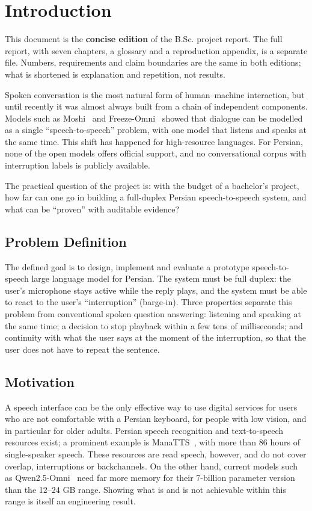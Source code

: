 \chapter{Introduction}
\label{ch:intro}

This document is the \textbf{concise edition} of the B.Sc. project report. The
full report, with seven chapters, a glossary and a reproduction appendix, is a
separate file. Numbers, requirements and claim boundaries are the same in both
editions; what is shortened is explanation and repetition, not results.

Spoken conversation is the most natural form of human--machine interaction, but
until recently it was almost always built from a chain of independent
components. Models such as Moshi~\cite{defossez2024moshi} and
Freeze-Omni~\cite{wang2025freezeomni} showed that dialogue can be modelled as a
single ``speech-to-speech'' problem, with one model that listens and speaks at
the same time. This shift has happened for high-resource languages. For Persian,
none of the open models offers official support, and no conversational corpus
with interruption labels is publicly available.

The practical question of the project is: with the budget of a bachelor's
project, how far can one go in building a full-duplex Persian speech-to-speech
system, and what can be ``proven'' with auditable evidence?

\section{Problem Definition}
\label{sec:problem}

The defined goal is to design, implement and evaluate a prototype
speech-to-speech large language model for Persian. The system must be full
duplex: the user's microphone stays active while the reply plays, and the system
must be able to react to the user's ``interruption'' (barge-in). Three properties
separate this problem from conventional spoken question answering: listening and
speaking at the same time; a decision to stop playback within a few tens of
milliseconds; and continuity with what the user says at the moment of the
interruption, so that the user does not have to repeat the sentence.

\section{Motivation}

A speech interface can be the only effective way to use digital services for
users who are not comfortable with a Persian keyboard, for people with low
vision, and in particular for older adults. Persian speech recognition and
text-to-speech resources exist; a prominent example is
ManaTTS~\cite{qharabagh2025manatts}, with more than 86 hours of single-speaker
speech. These resources are read speech, however, and do not cover overlap,
interruptions or backchannels. On the other hand, current models such as
Qwen2.5-Omni~\cite{xu2025qwen25omni} need far more memory for their 7-billion
parameter version than the 12--24 GB range. Showing what is and is not
achievable within this range is itself an engineering result.

